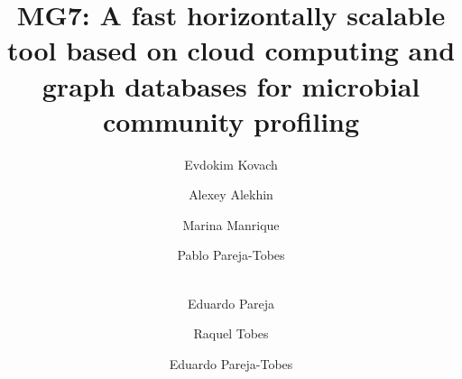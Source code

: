 \documentclass[a4paper]{llncs}
\begin{document}
\mainmatter  %

\title{MG7: A fast horizontally scalable tool based on cloud computing and graph databases for microbial community profiling}


%
%
\author{Evdokim Kovach%
\and Alexey Alekhin\and Marina Manrique\and Pablo Pareja-Tobes\and\\ %
Eduardo Pareja\and Raquel Tobes\and Eduardo Pareja-Tobes%
}
%


%
%

\maketitle
\end{document}
